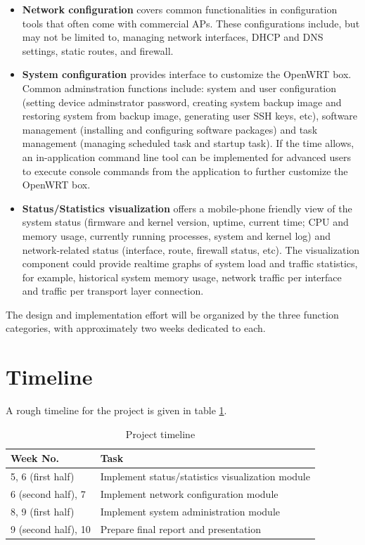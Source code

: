 \documentclass{sig-alternate-05-2015}
\begin{document}
	\begin{itemize}
		
		\item
		\textbf{Network configuration} covers common functionalities in configuration tools that often come with commercial APs. These configurations include, but may not be limited to, managing network interfaces, DHCP and DNS settings, static routes, and firewall.
		
		\item
		\textbf{System configuration} provides interface to customize the OpenWRT box. Common adminstration functions include: system and user configuration (setting device adminstrator password, creating system backup image and restoring system from backup image, generating user SSH keys, etc), software management (installing and configuring software packages) and task management (managing scheduled task and startup task). If the time allows, an in-application command line tool can be implemented for advanced users to execute console commands from the application to further customize the OpenWRT box.
		
		\item
		\textbf{Status/Statistics visualization} offers a mobile-phone friendly view of the system status (firmware and kernel version, uptime, current time; CPU and memory usage, currently running processes, system and kernel log) and network-related status (interface, route, firewall status, etc). The visualization component could provide realtime graphs of system load and traffic statistics, for example, historical system memory usage, network traffic per interface and traffic per transport layer connection.
		
	\end{itemize}
	
	The design and implementation effort will be organized by the three function categories, with approximately two weeks dedicated to each.
	
	\section{Timeline}
	
	A rough timeline for the project is given in table \ref{table:timeline}.
	
	\begin{table}[h]
		\centering
		\caption{Project timeline}
		\label{table:timeline}
		\begin{tabular}{p{3cm}|p{5cm}} \hline
			Week No. & Task \\ \hline
			5, 6 (first half) & Implement status/statistics visualization module \\ \hline
			6 (second half), 7 & Implement network configuration module \\ \hline
			8, 9 (first half) & Implement system administration module \\ \hline
			9 (second half), 10 & Prepare final report and presentation \\
			\hline\end{tabular}
	\end{table}
	
  
  
\end{document}
